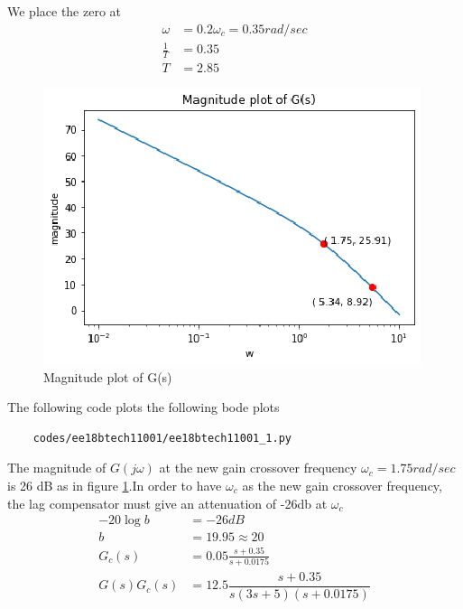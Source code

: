 We place the zero at 
\begin{align} 
   \omega &= 0.2\omega_{c} = 0.35 rad/sec 
   \\
   \frac{1}{T} &= 0.35
   \\
   T &= 2.85
\end{align}
\begin{figure}[!ht]
\centering
    \includegraphics[width=\columnwidth]{./figs/ee18btech11001/ee18btech11001_2.eps}
  \caption{Magnitude plot of G(s)}
  \label{fig:ee18btech11001_fig3}
\end{figure}
The following code plots the following bode plots
\begin{lstlisting}
    codes/ee18btech11001/ee18btech11001_1.py
\end{lstlisting}

The magnitude of $G(j\omega)$ at the new gain crossover frequency  $\omega_{c} = 1.75 rad/sec$ is 26 dB as in figure \ref{fig:ee18btech11001_fig3}.In order to have $\omega_{c}$  as the new gain crossover frequency, the lag compensator
must give an attenuation of -26db at $\omega_{c}$
\begin{align}
    -20 \log{b} &= -26dB
    \\
    b &= 19.95 \approx 20
    \\
    G_{c}(s) &=  0.05\frac{s + 0.35}{s + 0.0175}
    \\
    G(s)G_{c}(s) &= 12.5 \dfrac{s+0.35}{s(3s+5)(s+0.0175)} \label{eq:ee18btech11001_12}
\end{align}


